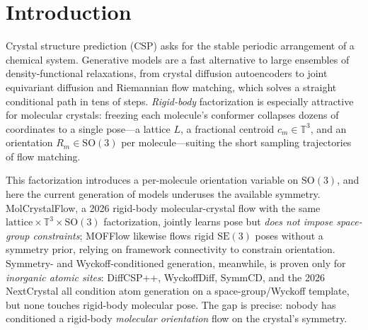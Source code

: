 \documentclass[10pt]{article}
\begin{document}
\section{Introduction}
Crystal structure prediction (CSP) asks for the stable periodic arrangement of a
chemical system. Generative models are a fast alternative to large ensembles of
density-functional relaxations, from crystal diffusion
autoencoders\cite{xie2022cdvae} to joint equivariant
diffusion\cite{jiao2023diffcsp} and Riemannian flow
matching\cite{miller2024flowmm,lipman2023flowmatching,chen2024riemannian}, which
solves a straight conditional path in tens of steps. \emph{Rigid-body}
factorization is especially attractive for molecular crystals: freezing each
molecule's conformer collapses dozens of coordinates to a single pose---a lattice
$L$, a fractional centroid $c_m\in\mathbb{T}^3$, and an orientation
$R_m\in\mathrm{SO}(3)$ per molecule---suiting the short sampling trajectories of
flow matching.

This factorization introduces a per-molecule orientation variable on $\mathrm{SO}(3)$, and here
the current generation of models underuses the available symmetry. MolCrystalFlow, a
2026 rigid-body molecular-crystal flow with the same
$\text{lattice}\times\mathbb{T}^3\times\mathrm{SO}(3)$ factorization, jointly
learns pose but \emph{does not impose space-group
constraints}\cite{zeng2026molcrystalflow}; MOFFlow likewise flows rigid
$\mathrm{SE}(3)$ poses without a symmetry prior, relying on framework
connectivity to constrain orientation\cite{kim2025mofflow}. Symmetry- and
Wyckoff-conditioned generation, meanwhile, is proven only for
\emph{inorganic atomic sites}: DiffCSP++\cite{jiao2024diffcsppp},
WyckoffDiff\cite{wyckoffdiff2025}, SymmCD\cite{symmcd2025}, and the 2026
NextCrystal\cite{mu2026nextcrystal} all condition atom generation on a
space-group/Wyckoff template, but none touches rigid-body molecular pose. The
gap is precise: nobody has conditioned a rigid-body \emph{molecular orientation}
flow on the crystal's symmetry.
\end{document}

